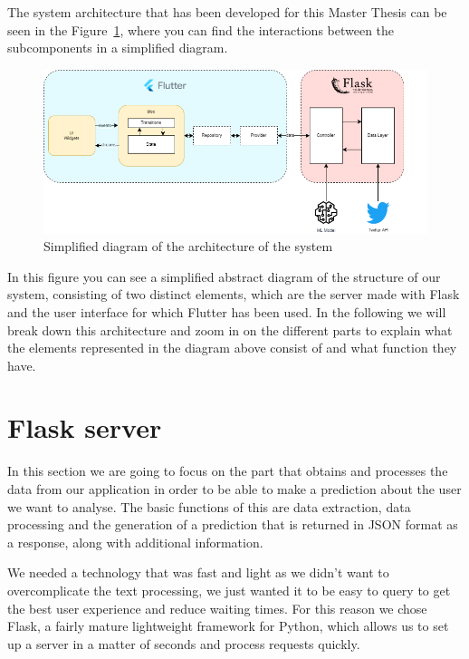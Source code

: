 The system architecture that has been developed for this Master Thesis can be seen in the Figure~\ref{fig:architecture}, where you can find the interactions between the subcomponents in a simplified diagram.

\begin{figure}[h]
    \centering
    \includegraphics[width=1.05\textwidth]{img/architecture/architecture.drawio.png}
    \caption{Simplified diagram of the architecture of the system}
    \label{fig:architecture}
\end{figure}


In this figure you can see a simplified abstract diagram of the structure of our system, consisting of two distinct elements, which are the server made with Flask and the user interface for which Flutter has been used. In the following we will break down this architecture and zoom in on the different parts to explain what the elements represented in the diagram above consist of and what function they have.


\section{Flask server}
\label{sec:server}
 In this section we are going to focus on the part that obtains and processes the data from our application in order to be able to make a prediction about the user we want to analyse. The basic functions of this are data extraction, data processing and the generation of a prediction that is returned in JSON format as a response, along with additional information.
 
 We needed a technology that was fast and light as we didn't want to overcomplicate the text processing, we just wanted it to be easy to query to get the best user experience and reduce waiting times. For this reason we chose Flask, a fairly mature lightweight framework for Python, which allows us to set up a server in a matter of seconds and process requests quickly.
 
